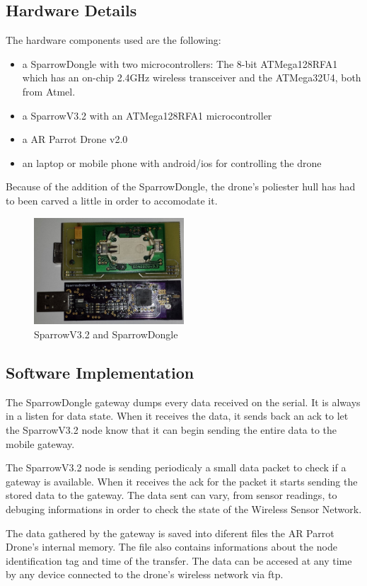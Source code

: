 \label{chap:impl}

 \subsection{Hardware Details}

The hardware components used are the following:
\begin{itemize}

\item a SparrowDongle with two microcontrollers: The 8-bit ATMega128RFA1 which has an on-chip 2.4GHz wireless transceiver and the ATMega32U4, both from Atmel.

\item a SparrowV3.2  with an ATMega128RFA1 microcontroller 

\item a AR Parrot Drone v2.0

\item an laptop or mobile phone with android/ios for controlling the drone

\end{itemize}

Because of the addition of the SparrowDongle, the drone's poliester hull has had to been carved a little in order to accomodate it.


\begin{figure}[ht] \centering
\includegraphics[width=0.5\textwidth]{img/sparrow.jpg} \caption{SparrowV3.2 and SparrowDongle} \end{figure}



\subsection{Software Implementation}

The SparrowDongle gateway dumps every data received on the serial. It is always in a listen for data state. When it receives the data, it sends back an ack to let the SparrowV3.2 node know that it can begin sending the entire data to the mobile gateway. 

The SparrowV3.2 node is sending periodicaly a small data packet to check if a gateway is available. When it receives the ack for the packet it starts sending the stored data to the gateway. The data sent can vary, from sensor readings, to debuging informations in order to check the state of the Wireless Sensor Network.

The data gathered by the gateway is saved into diferent files the AR Parrot Drone's internal memory. The file also contains informations about the node identification tag and time of the transfer. The data can be accesed at any time by any device connected to the drone's wireless network via ftp.
